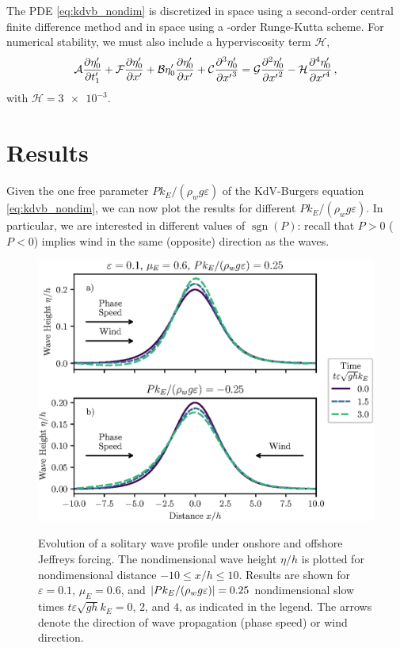 \documentclass{jfm}
\DeclareMathOperator{\sgn}{sgn}
\renewcommand*{\epsilon}{\varepsilon}
\begin{document}
The PDE \cref{eq:kdvb_nondim} is discretized in space using a
second-order central finite difference method and in space using a
-order Runge-Kutta scheme.
For numerical stability, we must also include a hyperviscosity term
$\mathcal{H}$,
\begin{equation}
  \mathcal{A} \pdv{\eta'_0}{t'_1} + \mathcal{F} \pdv{\eta'_0}{x'} + \mathcal{B}
  \eta'_0 \pdv{\eta'_0}{x'} + \mathcal{C} \pdv[3]{\eta'_0}{{x'}} =
  \mathcal{G} \pdv[2]{\eta'_0}{{x'}} - \mathcal{H}
  \pdv[4]{\eta'_0}{{x'}} \,,
\end{equation}
with $\mathcal{H} = \num{3e-3}$.

\section{Results}
Given the one free parameter $P k_E/(\rho_w g \epsilon)$ of the
KdV-Burgers equation \cref{eq:kdvb_nondim}, we can now plot the results
for different $P k_E/(\rho_w g \epsilon)$.
In particular, we are interested in different values of $\sgn(P)$:
recall that $P>0$ ($P<0$) implies wind in the same (opposite) direction
as the waves.

\begin{figure}
  \centering
  { %
    \label{fig:snapshots_solitary:a}
    \label{fig:snapshots_solitary:b}
  }
  \includegraphics{Snapshots-Positive-Negative.eps}
  \caption{
    Evolution of a solitary wave profile under
    onshore and
    offshore Jeffreys forcing.
    The nondimensional wave height $\eta/h$ is plotted for
    nondimensional distance $-10 \le x/h \le 10$.
    Results are shown for $\epsilon=0.1$, $\mu_E = 0.6$, and $\abs{P
    k_E/(\rho_w g \epsilon)} = 0.25$ nondimensional slow times $t
    \epsilon \sqrt{gh} k_E = 0$, $2$, and $4$, as indicated in the
    legend.
    The arrows denote the direction of wave propagation (phase speed) or
    wind direction.
  }
  \label{fig:snapshots_solitary}
\end{figure}
\end{document}
